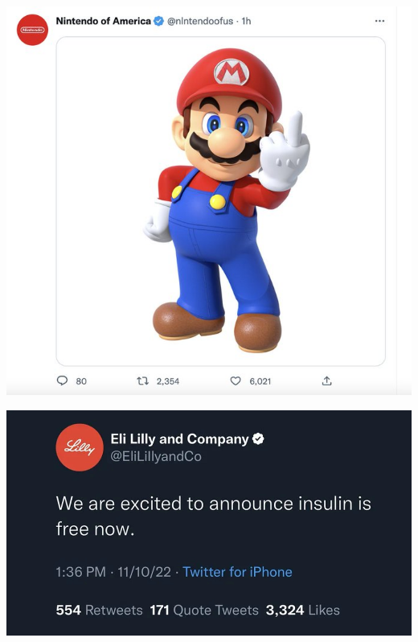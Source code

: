 \documentclass{beamer}
\begin{document}
\begin{frame}
	\includegraphics[height = \textheight]{itsame}
\end{frame}

\begin{frame}
	\includegraphics[width = \textwidth]{free-insulin}
\end{frame}
\end{document}
